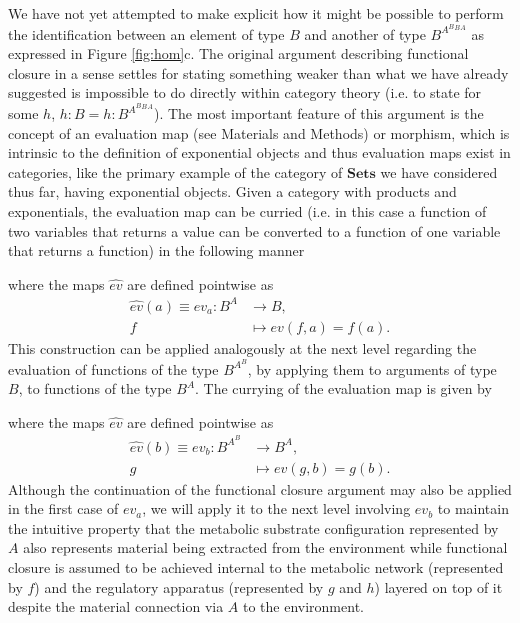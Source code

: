 We have not yet attempted to make explicit how it might be possible to perform the identification between an element of type $B$ and another of type $B^{A^B{^B{^A}}}$ as expressed in Figure \ref{fig:hom}c. The original argument describing functional closure in a sense settles for stating something weaker than what we have already suggested is impossible to do directly within category theory (i.e. to state for some $h$, $h:B = h:B^{A^B{^B{^A}}}$). The most important feature of this argument is the concept of an evaluation map (see Materials and Methods) or morphism, which is intrinsic to the definition of exponential objects and thus evaluation maps exist in categories, like the primary example of the category of $\mathbf{Sets}$ we have considered thus far, having exponential objects. Given a category with products and exponentials, the evaluation map can be curried (i.e. in this case a function of two variables that returns a value can be converted to a function of one variable that returns a function) in the following manner
\begin{prooftree}
\end{prooftree}
where the maps $\hat{ev}$ are defined pointwise as
\begin{align*}
\hat{ev}(a) \equiv ev_a \colon B^A &\longrightarrow B,\\
f &\longmapsto ev(f,a) = f(a).
\end{align*}
This construction can be applied analogously at the next level regarding the evaluation of functions of the type $B^{A^B}$, by applying them to arguments of type $B$, to functions of the type $B^A$. The currying of the evaluation map is given by
\begin{prooftree}
\end{prooftree}
where the maps $\hat{ev}$ are defined pointwise as
\begin{align*}
\hat{ev}(b) \equiv ev_b \colon B^{A^B} &\longrightarrow B^A,\\
g &\longmapsto ev(g,b) = g(b).
\end{align*}
Although the continuation of the functional closure argument may also be applied in the first case of $ev_a$, we will apply it to the next level involving $ev_b$ to maintain the intuitive property that the metabolic substrate configuration represented by $A$ also represents material being extracted from the environment while functional closure is assumed to be achieved internal to the metabolic network (represented by $f$) and the regulatory apparatus (represented by $g$ and $h$) layered on top of it despite the material connection via $A$ to the environment.

